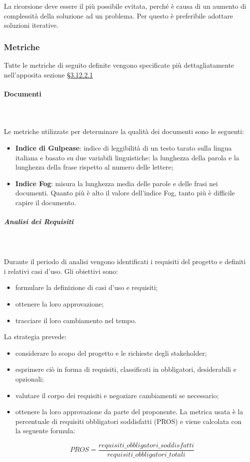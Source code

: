 		 \mbox{} \\ \mbox{} \\
		La ricorsione deve essere il più possibile evitata, perché è causa di un aumento di complessità della soluzione ad un problema. Per questo è preferibile adottare soluzioni iterative.
	\subsubsection{Metriche}
	Tutte le metriche di seguito definite vengono specificate più dettagliatamente nell'apposita sezione \S \hyperref[sez:metriche]{3.12.2.1} 
			\paragraph{Documenti}\mbox{} \\ \mbox{} \\
			Le metriche utilizzate per determinare la qualità dei documenti sono le seguenti: \begin{itemize}
			\item \textbf{Indice di Gulpease}: indice di leggibilità di un testo tarato sulla lingua italiana e basato su due variabili linguistiche: la lunghezza della parola e la lunghezza della frase rispetto al numero delle lettere;
			\item \textbf{Indice Fog}: misura la lunghezza media delle parole e delle frasi nei documenti. Quanto più è alto il valore dell'indice Fog, tanto più è difficile capire il documento.
			\end{itemize}
			\subparagraph*{Analisi dei Requisiti} \mbox{} \\ \mbox{} \\
			Durante il periodo di analisi vengono identificati i requisiti del progetto e definiti i relativi casi d'uso. 
			Gli obiettivi sono:
			\begin{itemize}
			\item  formulare la definizione di casi d'uso e requisiti;
			\item ottenere la loro approvazione;
			\item tracciare il loro cambiamento nel tempo.
			\end{itemize}
			La strategia prevede:
			\begin{itemize}
			\item considerare lo scopo del progetto e le richieste degli stakeholder;
			\item esprimere ciò in forma di requisiti, classificati in obbligatori, desiderabili e opzionali;
			\item valutare il corpo dei requisiti e negoziare cambiamenti se necessario;
			\item ottenere la loro approvazione da parte del proponente.
			La metrica usata è la percentuale di requisiti obbligatori soddisfatti (PROS) e viene
calcolata con la seguente formula: 

		\[ PROS = \frac{requisiti\_obbligatori\_soddisfatti}{requisiti\_obbligatori\_totali} \]
			\end{itemize}

